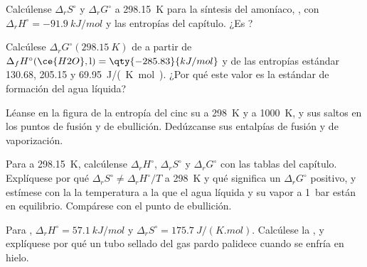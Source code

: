 \begin{exercise}[$\star$]\label{exo:b2:reaction-free-energy:2}
Calcúlense $\Delta_r S^\circ$ y $\Delta_r G^\circ$ a \qty{298.15}{K} para la
síntesis del amoníaco, , con $\Delta_r
H^\circ = \qty{-91.9}{kJ/mol}$ y las entropías del capítulo. ¿Es
?
\end{exercise}

\begin{exercise}[$\star$]\label{exo:b2:reaction-free-energy:3}
Calcúlese $\Delta_r G^\circ(\qty{298.15}{K})$ de  a partir de $\Delta_f H^\circ(\ce{H2O}, \text{l}) = \qty{-285.83}{kJ/mol}$
y de las entropías estándar  130.68,  205.15 y
 \qty{69.95}{J/(K.mol)}. ¿Por qué este valor es la 
estándar de formación del agua líquida?
\end{exercise}

\begin{exercise}[$\star$]\label{exo:b2:reaction-free-energy:4}
Léanse en la figura de la entropía del cinc su  a
\qty{298}{K} y a \qty{1000}{K}, y sus saltos en los puntos de fusión y de
ebullición. Dedúzcanse sus entalpías de fusión y de vaporización.
\end{exercise}

\begin{exercise}[$\star\star$]\label{exo:b2:reaction-free-energy:5}
Para  a \qty{298.15}{K}, calcúlense $\Delta_r H^\circ$,
$\Delta_r S^\circ$ y $\Delta_r G^\circ$ con las tablas del capítulo.
Explíquese por qué $\Delta_r S^\circ \neq \Delta_r H^\circ/T$ a \qty{298}{K} y qué
significa un $\Delta_r G^\circ$ positivo, y estímese con la  la temperatura a la que el agua líquida y su vapor a
\qty{1}{bar} están en equilibrio. Compárese con el punto de ebullición.
\end{exercise}

\begin{exercise}[$\star\star$]\label{exo:b2:reaction-free-energy:6}
Para , $\Delta_r H^\circ = \qty{57.1}{kJ/mol}$ y
$\Delta_r S^\circ = \qty{175.7}{J/(K.mol)}$. Calcúlese la , y explíquese por qué un tubo sellado del gas pardo  palidece
cuando se enfría en hielo.
\end{exercise}

